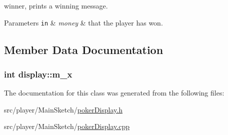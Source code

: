 winner, prints a winning message. 


\begin{DoxyParams}[1]{Parameters}
\mbox{\tt in}  & {\em money} & that the player has won. \\
\hline
\end{DoxyParams}


\subsection{Member Data Documentation}
\hypertarget{classdisplay_a1629c9fd626b085455a2a617fff9eac9}{
\subsubsection[{m\-\_\-x}]{\setlength{\rightskip}{0pt plus 5cm}int display\-::m\-\_\-x\hspace{0.3cm}{\ttfamily [private]}}}\label{classdisplay_a1629c9fd626b085455a2a617fff9eac9}


The documentation for this class was generated from the following files\-:\begin{DoxyCompactItemize}
\item 
src/player/\-Main\-Sketch/\hyperlink{MainSketch_2pokerDisplay_8h}{poker\-Display.\-h}\item 
src/player/\-Main\-Sketch/\hyperlink{MainSketch_2pokerDisplay_8cpp}{poker\-Display.\-cpp}\end{DoxyCompactItemize}
